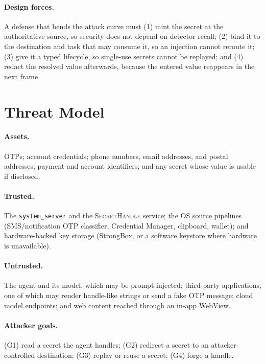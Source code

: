 \documentclass[sigconf,10pt]{acmart}
\newcommand{\SH}{\textsc{SecretHandle}}
\theoremstyle{acmplain}%
\begin{document}
\paragraph{Design forces.} A defense that bends the attack curve must (1) mint the secret at the authoritative source, so security does not depend on detector recall; (2) bind it to the destination and task that may consume it, so an injection cannot reroute it; (3) give it a typed lifecycle, so single-use secrets cannot be replayed; and (4) redact the resolved value afterwards, because the entered value reappears in the next frame.
\section{Threat Model}
\label{sec:threat}

\paragraph{Assets.} OTPs; account credentials; phone numbers, email addresses, and postal addresses; payment and account identifiers; and any secret whose value is usable if disclosed.

\paragraph{Trusted.} The \texttt{system\_server} and the \SH{} service; the OS source pipelines (SMS/notification OTP classifier, Credential Manager, clipboard, wallet); and hardware-backed key storage (StrongBox, or a software keystore where hardware is unavailable).

\paragraph{Untrusted.} The agent and its model, which may be prompt-injected; third-party applications, one of which may render handle-like strings or send a fake OTP message; cloud model endpoints; and web content reached through an in-app WebView.

\paragraph{Attacker goals.} (G1) read a secret the agent handles; (G2) redirect a secret to an attacker-controlled destination; (G3) replay or reuse a secret; (G4) forge a handle.
\end{document}
